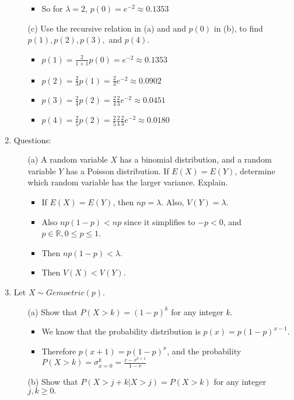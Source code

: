 \documentclass{article}
\begin{document}
\begin{enumerate}
\begin{itemize}
\begin{itemize}
        \item So for $\lambda=2$, $p(0) = e^{-2} \approx 0.1353$
        \end{itemize}
    \item [(c)] Use the recursive relation in (a) and and $p(0)$ in (b), to find $p(1),p(2),p(3),$ and $p(4)$.
        \begin{itemize}
        \item $p(1) = \frac{2}{1+1}p(0) = e^{-2} \approx 0.1353$
        \item $p(2) = \frac{2}{3}p(1) = \frac{2}{3} e^{-2} \approx 0.0902$
        \item $p(3) = \frac{2}{4}p(2) = \frac{2}{4} \frac{2}{3} e^{-2} \approx 0.0451$
        \item $p(4) = \frac{2}{5}p(2) = \frac{2}{5} \frac{2}{4} \frac{2}{3} e^{-2} \approx 0.0180$
        \end{itemize}
    \end{itemize}
\item Questions:
    \begin{itemize}
    \item [(a)] A random variable $X$ has a binomial distribution, and a random variable $Y$ has a Poisson distribution. If $E(X)=E(Y)$, determine which random variable has the larger variance. Explain.
        \begin{itemize}
        \item If $E(X) = E(Y)$, then $np = \lambda$. Also, $V(Y) = \lambda$.
        \item Also $np(1 - p) < np$ since it simplifies to $-p < 0$, and $p \in \mathbb{R}, 0 \leq p \leq 1$.
        \item Then $np(1 - p) < \lambda$.
        \item Then $V(X) < V(Y)$.
        \end{itemize}
    \end{itemize}
\item Let $X \sim Gemoetric(p)$.
    \begin{enumerate}
    \item [(a)] Show that $P(X>k)=(1-p)^k$ for any integer $k$.
        \begin{itemize}
        \item We know that the probability distribution is $p(x) = p(1 - p)^{x-1}$.
        \item Therefore $p(x + 1) = p(1 - p)^x$, and the probability $P(X > k) = \sigma_{x=0}^k = \frac{r - r^{k+1}}{1-r}$

        \end{itemize}
    \item [(b)] Show that  $P(X> j+k|X > j)=P(X > k)$ for any integer $j,k\ge 0.$
    \end{enumerate}

\end{enumerate}
\end{document}
